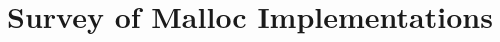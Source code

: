 \documentclass[12pt]{cslreport}
\begin{document}





{\small
 

}


\appendix

\chapter{Survey of Malloc Implementations}








\end{document}
